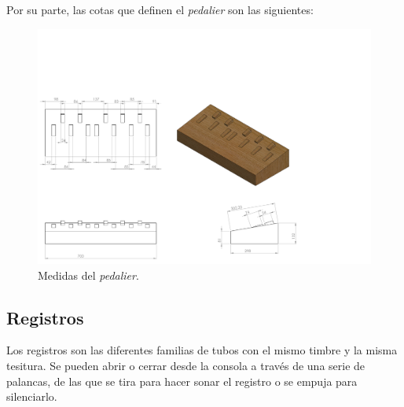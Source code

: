 \smallskip

Por su parte, las cotas que definen el \textit{pedalier} son las siguientes:

\smallskip

\begin{figure}[H]
	\noindent \begin{centering}
		\includegraphics[clip=true,trim=0 0 260 250, width=\linewidth*3/4]{capitulo3/pedalier_modelo}
		\par\end{centering}
	\smallskip
	\caption{\label{fig:pedalier_modelo} Medidas del \textit{pedalier}.}
\end{figure} 

\smallskip

\subsection{Registros}

Los registros son las diferentes familias de tubos con el mismo timbre y la misma tesitura. Se pueden abrir o cerrar desde la consola a través de una serie de palancas, de las que se tira para hacer sonar el registro o se empuja para silenciarlo.

\smallskip

